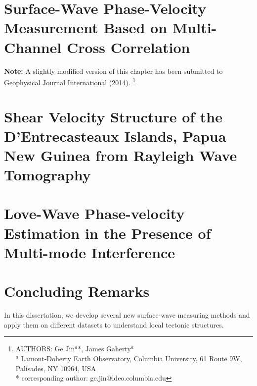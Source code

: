 \documentclass[12pt,oneside]{book}
\begin{document}
\chapter[Surface-Wave Measurement Based on Cross Correlation]{Surface-Wave Phase-Velocity Measurement Based on Multi-Channel Cross Correlation}
\label{ch:aswms}
\doublespacing

\thispagestyle{fancy}

\begin{raggedright}
{\bf Note: } A slightly modified version of this chapter has been submitted to Geophysical Journal International (2014).
\footnote{AUTHORS:  Ge Jin$^a$*,  James Gaherty$^a$\\
$^a$ Lamont-Doherty Earth Observatory, Columbia University, 61 Route 9W, Palisades, NY 10964, USA\\
* corresponding author: ge.jin@ldeo.columbia.edu}
\end{raggedright}
\normalsize


\singlespacing
\chapter[Shear velocity structure of the DI, PNG]{Shear Velocity Structure of the D'Entrecasteaux Islands, Papua New Guinea from Rayleigh Wave Tomography}
\label{ch:png}
\doublespacing

\singlespacing
\chapter[Love-wave Overtone Interference]{Love-Wave Phase-velocity Estimation in the Presence of Multi-mode Interference}
\label{ch:overtone}
\doublespacing

\singlespacing
\chapter[Conclusion]{Concluding Remarks}
\label{ch:conclusion}
\doublespacing

In this dissertation, we develop several new surface-wave measuring methods and apply them on different datasets to understand local tectonic structures.
\end{document}
